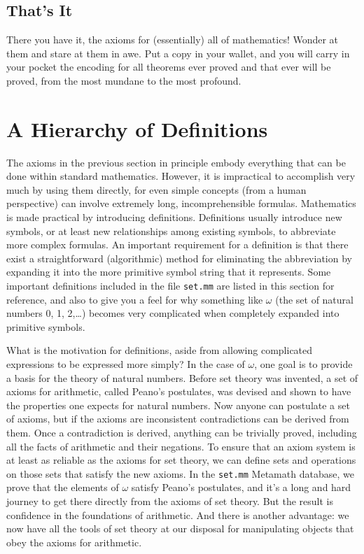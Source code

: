 \subsection{That's It}

There you have it, the axioms for (essentially) all of mathematics!
Wonder at them and stare at them in awe.  Put a copy in your wallet, and
you will carry in your pocket the encoding for all theorems ever proved
and that ever will be proved, from the most mundane to the most
profound.

\section{A Hierarchy of Definitions}\label{hierarchy}

The axioms in the previous section in principle embody everything that can be
done within standard mathematics.  However, it is impractical to accomplish
very much by using them directly, for even simple concepts (from a human
perspective) can involve extremely long, incomprehensible formulas.
Mathematics is made practical by introducing definitions.
Definitions usually introduce new symbols, or at least new relationships among
existing symbols, to abbreviate more complex formulas.  An important
requirement for a definition is that there exist a straightforward
(algorithmic) method for eliminating the abbreviation by expanding it into the
more primitive symbol string that it represents.  Some
important definitions included in
the file \texttt{set.mm} are listed in this section for reference, and also to
give you a feel for why something like $\omega$ (the
set of natural numbers 0, 1, 2,\ldots) becomes very
complicated when completely expanded into primitive symbols.

What is the motivation for definitions, aside from allowing complicated
expressions to be expressed more simply?  In the case of  $\omega$, one goal is
to provide a basis for the theory of natural numbers.
Before set theory was invented, a set of axioms for arithmetic, called Peano's
postulates, was devised and shown to have the
properties one expects for natural numbers.  Now anyone can postulate a
set of axioms, but if the axioms are inconsistent contradictions can be derived
from them.  Once a contradiction is derived, anything can be trivially
proved, including
all the facts of arithmetic and their negations.  To ensure that an
axiom system is at least as reliable as the axioms for set theory, we can
define sets and operations on those sets that satisfy the new axioms. In the
\texttt{set.mm} Metamath database, we prove that the elements of $\omega$ satisfy
Peano's postulates, and it's a long and hard journey to get there directly
from the axioms of set theory.  But the result is confidence in the
foundations of arithmetic.  And there is another advantage:  we now have all
the tools of set theory at our disposal for manipulating objects that obey the
axioms for arithmetic.

